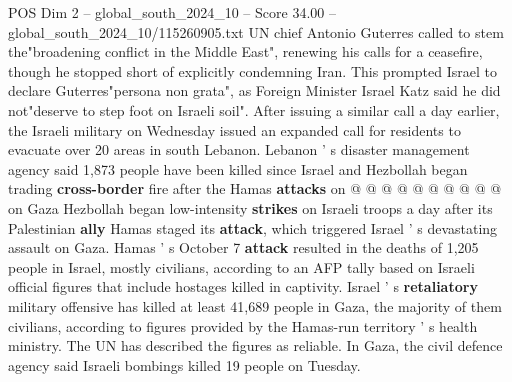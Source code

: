 \begin{textsample}{POS Dim 2 – global\_south\_2024\_10 – Score 34.00 – global\_south\_2024\_10/115260905.txt}
UN chief Antonio Guterres called to stem the"broadening conflict in the Middle East", renewing his calls for a ceasefire, though he stopped short of explicitly condemning Iran.
This prompted Israel to declare Guterres"persona non grata", as Foreign Minister Israel Katz said he did not"deserve to step foot on Israeli soil".
After issuing a similar call a day earlier, the Israeli military on Wednesday issued an expanded call for residents to evacuate over 20 areas in south Lebanon.
Lebanon ' s disaster management agency said 1,873 people have been killed since Israel and Hezbollah began trading \textbf{cross-border} fire after the Hamas \textbf{attacks} on @ @ @ @ @ @ @ @ @ @ on Gaza Hezbollah began low-intensity \textbf{strikes} on Israeli troops a day after its Palestinian \textbf{ally} Hamas staged its \textbf{attack}, which triggered Israel ' s devastating assault on Gaza.
Hamas ' s October 7 \textbf{attack} resulted in the deaths of 1,205 people in Israel, mostly civilians, according to an AFP tally based on Israeli official figures that include hostages killed in captivity.
Israel ' s \textbf{retaliatory} military offensive has killed at least 41,689 people in Gaza, the majority of them civilians, according to figures provided by the Hamas-run territory ' s health ministry.
The UN has described the figures as reliable.
In Gaza, the civil defence agency said Israeli bombings killed 19 people on Tuesday.

\end{textsample}
